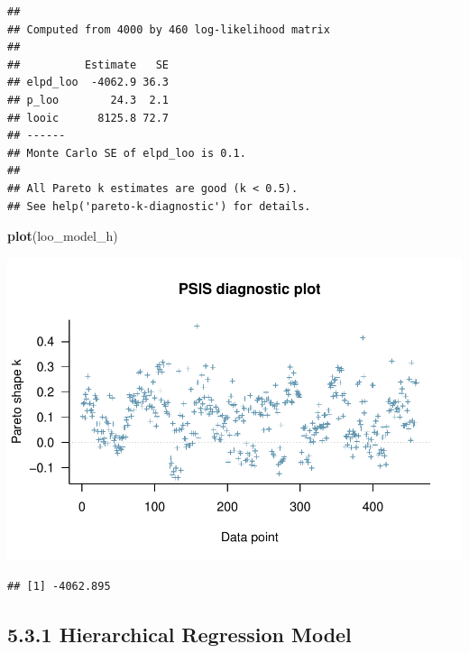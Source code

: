\documentclass[]{article}
\newenvironment{Shaded}{\begin{snugshade}}{\end{snugshade}}
\newcommand{\KeywordTok}[1]{\textcolor[rgb]{0.13,0.29,0.53}{\textbf{#1}}}
\newcommand{\DecValTok}[1]{\textcolor[rgb]{0.00,0.00,0.81}{#1}}
\newcommand{\CommentTok}[1]{\textcolor[rgb]{0.56,0.35,0.01}{\textit{#1}}}
\newcommand{\OperatorTok}[1]{\textcolor[rgb]{0.81,0.36,0.00}{\textbf{#1}}}
\newcommand{\NormalTok}[1]{#1}
\begin{document}
\begin{verbatim}
## 
## Computed from 4000 by 460 log-likelihood matrix
## 
##          Estimate   SE
## elpd_loo  -4062.9 36.3
## p_loo        24.3  2.1
## looic      8125.8 72.7
## ------
## Monte Carlo SE of elpd_loo is 0.1.
## 
## All Pareto k estimates are good (k < 0.5).
## See help('pareto-k-diagnostic') for details.
\end{verbatim}

\begin{Shaded}
\begin{Highlighting}[]
\KeywordTok{plot}\NormalTok{(loo_model_h)}
\end{Highlighting}
\end{Shaded}

\includegraphics{Data_science_project_files/figure-latex/unnamed-chunk-22-2.pdf}

\begin{Shaded}
\end{Shaded}

\begin{verbatim}
## [1] -4062.895
\end{verbatim}

\subsection{5.3.1 Hierarchical Regression
Model}\label{hierarchical-regression-model}
\end{document}

